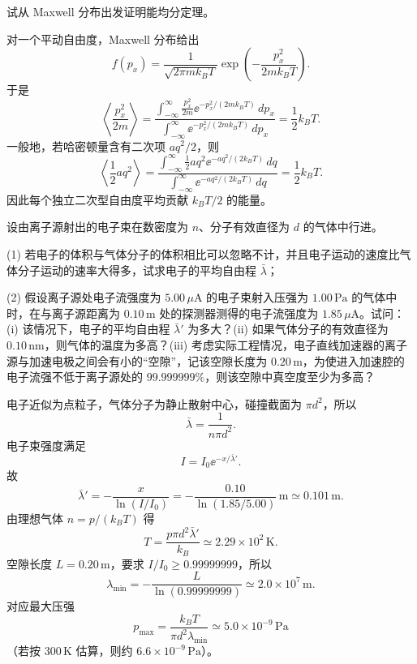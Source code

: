 \begin{question}
试从 Maxwell 分布出发证明能均分定理。
\begin{solution}
对一个平动自由度，Maxwell 分布给出
\[
f(p_x)=\frac1{\sqrt{2\pi mk_BT}}\exp\left(-\frac{p_x^2}{2mk_BT}\right).
\]
于是
\[
\left\langle \frac{p_x^2}{2m}\right\rangle
=\frac{\int_{-\infty}^{\infty}\frac{p_x^2}{2m}\ee^{-p_x^2/(2mk_BT)}\,dp_x}{\int_{-\infty}^{\infty}\ee^{-p_x^2/(2mk_BT)}\,dp_x}
=\frac12k_BT.
\]
一般地，若哈密顿量含有二次项 $a q^2/2$，则
\[
\left\langle \frac12a q^2\right\rangle
=\frac{\int_{-\infty}^{\infty}\frac12a q^2 \ee^{-aq^2/(2k_BT)}\,dq}{\int_{-\infty}^{\infty}\ee^{-aq^2/(2k_BT)}\,dq}
=\frac12k_BT.
\]
因此每个独立二次型自由度平均贡献 $k_BT/2$ 的能量。

\end{solution}
\end{question}

\begin{question}
设由离子源射出的电子束在数密度为 $n$、分子有效直径为 $d$ 的气体中行进。

(1) 若电子的体积与气体分子的体积相比可以忽略不计，并且电子运动的速度比气体分子运动的速率大得多，试求电子的平均自由程 $\bar\lambda$；

(2) 假设离子源处电子流强度为 $5.00\,\mu\mathrm A$ 的电子束射入压强为 $1.00\,\mathrm{Pa}$ 的气体中时，在与离子源距离为 $0.10\,\mathrm m$ 处的探测器测得的电子流强度为 $1.85\,\mu\mathrm A$。试问：(i) 该情况下，电子的平均自由程 $\bar\lambda'$ 为多大？(ii) 如果气体分子的有效直径为 $0.10\,\mathrm{nm}$，则气体的温度为多高？(iii) 考虑实际工程情况，电子直线加速器的离子源与加速电极之间会有小的“空隙”，记该空隙长度为 $0.20\,\mathrm m$，为使进入加速腔的电子流强不低于离子源处的 $99.999999\%$，则该空隙中真空度至少为多高？
\begin{solution}
电子近似为点粒子，气体分子为静止散射中心，碰撞截面为 $\pi d^2$，所以
\[
\bar\lambda=\frac1{n\pi d^2}.
\]
电子束强度满足
\[
I=I_0\ee^{-x/\bar\lambda'}.
\]
故
\[
\bar\lambda'=-\frac{x}{\ln(I/I_0)}
=-\frac{0.10}{\ln(1.85/5.00)}\,\mathrm m
\simeq0.101\,\mathrm m.
\]
由理想气体 $n=p/(k_BT)$ 得
\[
T=\frac{p\pi d^2\bar\lambda'}{k_B}
\simeq2.29\times10^2\,\mathrm K.
\]
空隙长度 $L=0.20\,\mathrm m$，要求 $I/I_0\ge0.99999999$，所以
\[
\lambda_{\min}=-\frac{L}{\ln(0.99999999)}\simeq2.0\times10^7\,\mathrm m.
\]
对应最大压强
\[
p_{\max}=\frac{k_BT}{\pi d^2\lambda_{\min}}
\simeq5.0\times10^{-9}\,\mathrm{Pa}
\]
（若按 $300\,\mathrm K$ 估算，则约 $6.6\times10^{-9}\,\mathrm{Pa}$）。

\end{solution}
\end{question}

